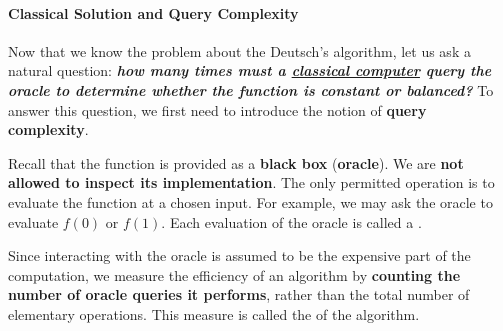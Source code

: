 \paragraph{Classical Solution and Query Complexity}\label{ex:classical-solution-and-query-complexity}

Now that we know the problem about the Deutsch's algorithm, let us ask a natural question: \emph{\textbf{how many times must a \underline{classical computer} query the oracle to determine whether the function is constant or balanced?}} To answer this question, we first need to introduce the notion of \textbf{query complexity}.

\highspace
Recall that the function is provided as a \textbf{black box} (\textbf{oracle}). We are \textbf{not allowed to inspect its implementation}. The only permitted operation is to evaluate the function at a chosen input. For example, we may ask the oracle to evaluate $f(0)$ or $f(1)$. Each evaluation of the oracle is called a .

\highspace
Since interacting with the oracle is assumed to be the expensive part of the computation, we measure the efficiency of an algorithm by \textbf{counting the number of oracle queries it performs}, rather than the total number of elementary operations. This measure is called the  of the algorithm.

